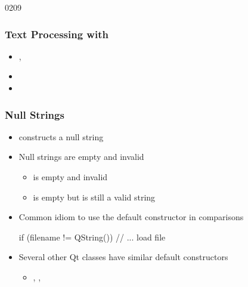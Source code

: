 \begin{slide}{0209}\frametitle{Text Processing with }
\begin{itemize}
\item {}, 
\item {} 
\item {} 
\end{itemize}
\end{slide}

\begin{slide}[fragile]\frametitle{Null Strings}
\begin{itemize}
\item {} constructs a null string
\item Null strings are empty and invalid
  \begin{itemize}
  \item {} is empty and invalid
  \item {} is empty but is still a valid string
  \end{itemize}
\item Common idiom to use the default constructor in comparisons
\begin{cpp}
if (filename != QString()) {
   // ... load file
}
\end{cpp}
\item Several other Qt classes have similar default constructors
  \begin{itemize}
  \item {}, , 
  \end{itemize}
\end{itemize}
\end{slide}

